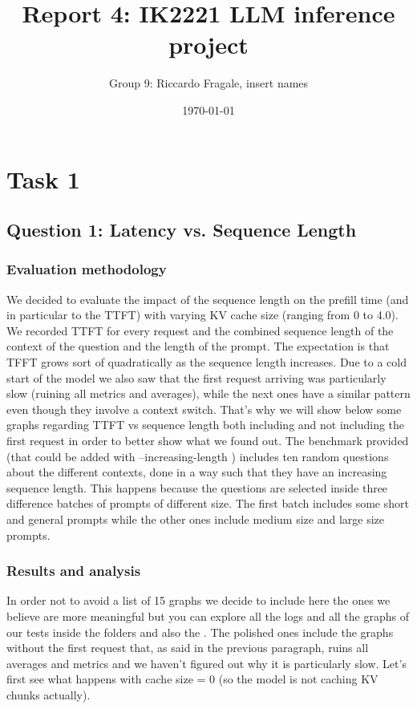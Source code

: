 \documentclass[a4paper, 11pt]{article}
\title{Report 4: IK2221 LLM inference project}
\author{Group 9: Riccardo Fragale, insert names}
\date{\today{}}
\begin{document}
\maketitle


\section{Task 1}
\subsection{Question 1: Latency vs. Sequence Length}
\subsubsection*{Evaluation methodology}
We decided to evaluate the impact of the sequence length on the prefill time (and in particular to the TTFT) with varying KV cache size (ranging from 0 to 4.0).
We recorded TTFT for every request and the combined sequence length of the context of the question and the length of the prompt.
The expectation is that TFFT grows sort of quadratically as the sequence length increases.
Due to a cold start of the model we also saw that the first request arriving was particularly slow (ruining all metrics and averages), while the next ones have a similar pattern
even though they involve a context switch. That's why we will show below some graphs regarding TTFT vs sequence length both including and not including the first request in order
to better show what we found out.
The benchmark provided (that could be added with --increasing-length ) includes ten random questions about the different contexts, done in a way such that they have an increasing sequence length.
This happens because the questions are selected inside three difference batches of prompts of different size.
The first batch includes some short and general prompts while the other ones include medium size and large size prompts.

\subsubsection*{Results and analysis}
 In order not to avoid a list of 15 graphs we decide to include here the ones we believe are more meaningful but you can explore all the logs and all the graphs of our tests inside the folders
   and also the . The polished ones include the graphs without 
 the first request that, as said in the previous paragraph, ruins all averages and metrics and we haven't figured out why it is particularly slow.
 Let's first see what happens with cache size = 0 (so the model is not caching KV chunks actually).
\end{document}
